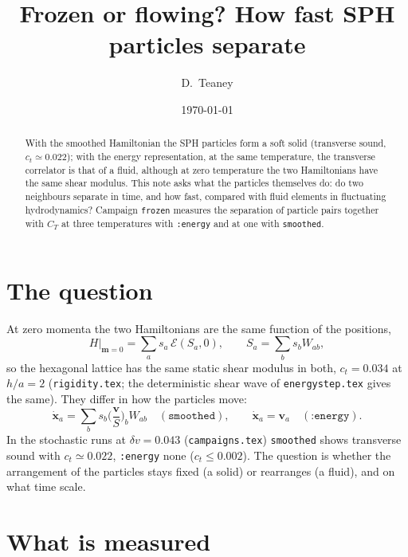 \documentclass[11pt,aps,preprint,nofootinbib,superscriptaddress,tightenlines]{revtex4-2}
\def\st{\begin{equation}}
\def\stp{\end{equation}}
\begin{document}
\title{Frozen or flowing?  How fast SPH particles separate}
\author{D.~Teaney}
\date{\today}

\begin{abstract}
With the smoothed Hamiltonian the SPH particles form a soft solid (transverse sound,
$c_t\simeq0.022$); with the energy representation, at the same temperature, the
transverse correlator is that of a fluid, although at zero temperature the two
Hamiltonians have the same shear modulus.  This note asks what the particles
themselves do: do two neighbours separate in time, and how fast, compared with fluid
elements in fluctuating hydrodynamics?  Campaign \texttt{frozen} measures the separation
of particle pairs together with $C_T$ at three temperatures with \texttt{:energy} and at
one with \texttt{smoothed}.
\end{abstract}

\maketitle

\section{The question}
\label{sec:question}

At zero momenta the two Hamiltonians are the same function of the positions,
\st
H\big|_{\bm m=0}=\sum_as_a\,\mathcal E(S_a,0),\qquad S_a=\sum_bs_bW_{ab},
\stp
so the hexagonal lattice has the same static shear modulus in both, $c_t=0.034$ at
$h/a=2$ (\texttt{rigidity.tex}; the deterministic shear wave of \texttt{energystep.tex}
gives the same).  They differ in how the particles move:
\st
\dot{\bm x}_a=\sum_bs_b\Big(\frac{\bm v}{S}\Big)_bW_{ab}\quad(\texttt{smoothed}),\qquad
\dot{\bm x}_a=\bm v_a\quad(\texttt{:energy}).
\label{xdot}
\stp
In the stochastic runs at $\delta v=0.043$ (\texttt{campaigns.tex}) \texttt{smoothed} shows
transverse sound with $c_t\simeq0.022$, \texttt{:energy} none ($c_t\le0.002$).  The question
is whether the arrangement of the particles stays fixed (a solid) or rearranges (a
fluid), and on what time scale.

\section{What is measured}
\label{sec:measure}
\end{document}
